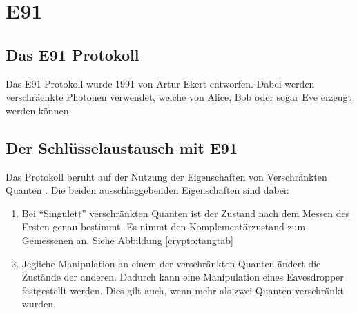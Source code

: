 \section{E91}
  \subsection{Das E91 Protokoll}
  Das E91 Protokoll wurde 1991 von Artur Ekert entworfen.
  Dabei werden verschr\"aenkte Photonen verwendet, welche von Alice, Bob oder sogar Eve erzeugt werden k\"onnen.

  \subsection{Der Schl\"usselaustausch mit E91}
  Das Protokoll beruht auf der Nutzung der Eigenschaften von Verschr\"ankten Quanten \cite{qc:verschraenkung}.
  Die beiden ausschlaggebenden Eigenschaften sind dabei:

  \begin{enumerate}
      \item Bei ``Singulett'' verschr\"ankten Quanten ist der Zustand nach dem Messen des Ersten genau bestimmt.
        Es nimmt den Komplement\"arzustand zum Gemessenen an.
        Siehe Abbildung \ref{crypto:tangtab}
      \item Jegliche Manipulation an einem der verschr\"ankten Quanten \"andert die Zust\"ande der anderen.
        Dadurch kann eine Manipulation eines Eavesdropper festgestellt werden.
        Dies gilt auch, wenn mehr als zwei Quanten verschr\"ankt wurden.
  \end{enumerate}

